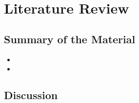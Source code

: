 \section{Literature Review}
\label{sec:nulla}

\subsection{Summary of the Material}
\lipsum[2]

\begin{itemize}
	\item \lipsum[1]
	\item \lipsum[2]
\end{itemize}

\lipsum[3]

\subsection{Discussion}
\lipsum[4-6]
